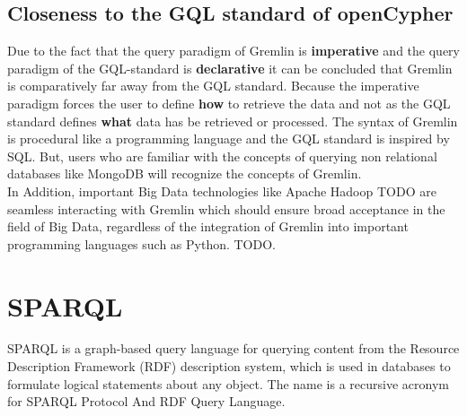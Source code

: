 \subsection{Closeness to the GQL standard of openCypher}
\label{subsec:different_query_languages_for_graph_databases:gremlin:iso}
Due to the fact that the query paradigm of Gremlin is \textbf{imperative} and the
query paradigm of the GQL-standard is \textbf{declarative} it can be concluded that Gremlin 
is comparatively far away from the GQL standard. Because the imperative paradigm 
forces the user to define \textbf{how} to retrieve the data and not as the GQL standard
defines \textbf{what} data has be retrieved or processed.
The syntax of Gremlin is procedural like a programming language and the GQL standard is
inspired by SQL.\newline
But, users who are familiar with the concepts of querying non relational databases like 
MongoDB will recognize the concepts of Gremlin.\\
In Addition, important Big Data technologies like Apache Hadoop TODO are seamless interacting
with Gremlin which should ensure broad acceptance in the field of Big Data, 
regardless of the integration of Gremlin into important programming languages such as Python.
TODO.

\section{SPARQL}
\label{sec:different_query_languages_for_graph_databases:sparql}
SPARQL is a graph-based query language for querying content from the Resource Description Framework (RDF) description system,
which is used in databases to formulate logical statements about any object. 
The name is a recursive acronym for SPARQL Protocol And RDF Query Language.

